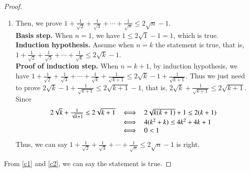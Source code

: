 \documentclass[12pt]{article}
\begin{document}
\begin{proof}
\begin{enumerate}
		\item \label{c2} Then, we prove $1+\frac{1}{\sqrt{2}}+\frac{1}{\sqrt{3}}+\cdots +\frac{1}{\sqrt{n}}\leq 2\sqrt{n}-1$.\\
		\textbf{Basis step.} When $n = 1$, we have $1 \leq 2\sqrt{1}-1 = 1$, which is true.\\
		\textbf{Induction hypothesis.} Assume when $n = k$ the statement is true, that is, $1+\frac{1}{\sqrt{2}}+\frac{1}{\sqrt{3}}+\cdots +\frac{1}{\sqrt{k}} \leq 2\sqrt{k}-1$.\\
		\textbf{Proof of induction step.} When $n = k+1$, by induction hypothesis, we have $1+\frac{1}{\sqrt{2}}+\frac{1}{\sqrt{3}}+\cdots +\frac{1}{\sqrt{k}} + \frac{1}{\sqrt{k+1}} \leq 2\sqrt{k}-1 + \frac{1}{\sqrt{k+1}}$. Thus we just need to prove $2\sqrt{k}-1 + \frac{1}{\sqrt{k+1}} \leq 2\sqrt{k+1}-1$, that is, $2\sqrt{k} + \frac{1}{\sqrt{k+1}} \leq 2\sqrt{k+1}$. Since 
		\begin{displaymath}
		\begin{tabular}{lcl}
		$2\sqrt{k} + \frac{1}{\sqrt{k+1}} \leq 2\sqrt{k+1}$ & $\Longleftrightarrow$ & $2\sqrt{k(k+1)} + 1 \leq 2(k+1)$ \\ 
		& $\Longleftrightarrow$ & $4(k^2 + k) \leq 4k^2 + 4k + 1$ \\
		& $\Longleftrightarrow$ & $0 < 1$
		\end{tabular}
		\end{displaymath}
		Thus, we can say $1+\frac{1}{\sqrt{2}}+\frac{1}{\sqrt{3}}+\cdots +\frac{1}{\sqrt{n}}\leq 2\sqrt{n}-1$ is right.
	\end{enumerate}
	From \ref{c1} and \ref{c2}, we can say the statement is true.
\end{proof}
\end{document}
